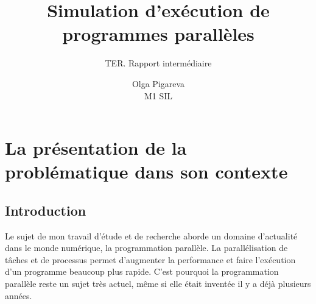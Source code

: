 \documentclass[12pt]{scrartcl}
\begin{document}
\pagestyle{fancy}
\rhead{  }

\title{%
Simulation d'exécution de programmes parallèles\\
\large } 

\subtitle{ TER. Rapport intermédiaire}
\author{Olga Pigareva\\
M1 SIL} %






\maketitle

\newpage

\tableofcontents %

\newpage %
\section{La présentation de la problématique dans son contexte}

\subsection{Introduction}
Le sujet de mon travail d'étude et de recherche aborde un domaine d'actualité dans le monde numérique, la programmation parallèle.
La parallélisation de tâches et de processus permet d'augmenter la performance et faire l'exécution d'un programme beaucoup plus rapide. 
C'est pourquoi la programmation parallèle reste un sujet très actuel, même si elle était inventée il y a déjà plusieurs années.\\
\end{document}
